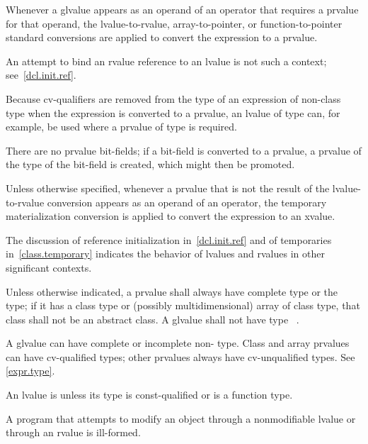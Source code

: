 \pnum
Whenever a glvalue appears as an operand of an operator that
requires a prvalue for that operand, the
lvalue-to-rvalue, array-to-pointer,
or function-to-pointer standard conversions are
applied to convert the expression to a prvalue.
\begin{note}
An attempt to bind an rvalue reference to an lvalue is not such a context; see~\ref{dcl.init.ref}.
\end{note}
\begin{note}
Because cv-qualifiers are removed from the type of an expression of
non-class type when the expression is converted to a prvalue, an lvalue
of type  can, for example, be used where
a prvalue of type  is required.
\end{note}
\begin{note}
There are no prvalue bit-fields; if a bit-field is converted to a
prvalue, a prvalue of the type of the bit-field is
created, which might then be promoted.
\end{note}

\pnum
Unless otherwise specified,
whenever a prvalue
that is not the result of the lvalue-to-rvalue conversion
appears as an operand of an operator,
the temporary materialization conversion is
applied to convert the expression to an xvalue.

\pnum
\begin{note}
The discussion of reference initialization in~\ref{dcl.init.ref} and of
temporaries in~\ref{class.temporary} indicates the behavior of lvalues
and rvalues in other significant contexts.
\end{note}

\pnum
Unless otherwise indicated,
a prvalue shall always have complete type or the  type;
if it has a class type or (possibly multidimensional) array of class type,
that class shall not be an abstract class.
A glvalue shall not have type \cv{}~.
\begin{note}
A glvalue can have complete or incomplete non- type.
Class and array prvalues can have cv-qualified types; other prvalues
always have cv-unqualified types. See \ref{expr.type}.
\end{note}

\pnum
An lvalue is  unless its type is const-qualified
or is a function type.
\begin{note}
A program that attempts
to modify an object through a nonmodifiable lvalue or through an rvalue
is ill-formed.
\end{note}

